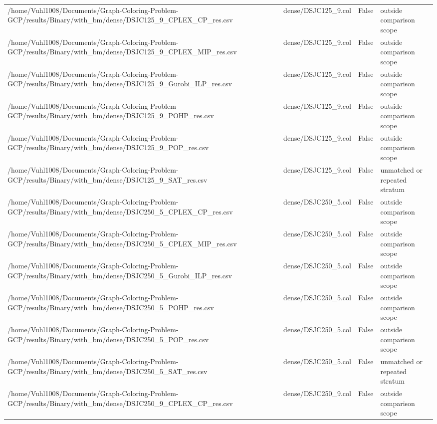 \begin{table}[htbp]
\begin{tabular}{llll}
/home/Vuhl1008/Documents/Graph-Coloring-Problem-GCP/results/Binary/with\_bm/dense/DSJC125\_9\_CPLEX\_CP\_res.csv & dense/DSJC125\_9.col & False & outside comparison scope \\
/home/Vuhl1008/Documents/Graph-Coloring-Problem-GCP/results/Binary/with\_bm/dense/DSJC125\_9\_CPLEX\_MIP\_res.csv & dense/DSJC125\_9.col & False & outside comparison scope \\
/home/Vuhl1008/Documents/Graph-Coloring-Problem-GCP/results/Binary/with\_bm/dense/DSJC125\_9\_Gurobi\_ILP\_res.csv & dense/DSJC125\_9.col & False & outside comparison scope \\
/home/Vuhl1008/Documents/Graph-Coloring-Problem-GCP/results/Binary/with\_bm/dense/DSJC125\_9\_POHP\_res.csv & dense/DSJC125\_9.col & False & outside comparison scope \\
/home/Vuhl1008/Documents/Graph-Coloring-Problem-GCP/results/Binary/with\_bm/dense/DSJC125\_9\_POP\_res.csv & dense/DSJC125\_9.col & False & outside comparison scope \\
/home/Vuhl1008/Documents/Graph-Coloring-Problem-GCP/results/Binary/with\_bm/dense/DSJC125\_9\_SAT\_res.csv & dense/DSJC125\_9.col & False & unmatched or repeated stratum \\
/home/Vuhl1008/Documents/Graph-Coloring-Problem-GCP/results/Binary/with\_bm/dense/DSJC250\_5\_CPLEX\_CP\_res.csv & dense/DSJC250\_5.col & False & outside comparison scope \\
/home/Vuhl1008/Documents/Graph-Coloring-Problem-GCP/results/Binary/with\_bm/dense/DSJC250\_5\_CPLEX\_MIP\_res.csv & dense/DSJC250\_5.col & False & outside comparison scope \\
/home/Vuhl1008/Documents/Graph-Coloring-Problem-GCP/results/Binary/with\_bm/dense/DSJC250\_5\_Gurobi\_ILP\_res.csv & dense/DSJC250\_5.col & False & outside comparison scope \\
/home/Vuhl1008/Documents/Graph-Coloring-Problem-GCP/results/Binary/with\_bm/dense/DSJC250\_5\_POHP\_res.csv & dense/DSJC250\_5.col & False & outside comparison scope \\
/home/Vuhl1008/Documents/Graph-Coloring-Problem-GCP/results/Binary/with\_bm/dense/DSJC250\_5\_POP\_res.csv & dense/DSJC250\_5.col & False & outside comparison scope \\
/home/Vuhl1008/Documents/Graph-Coloring-Problem-GCP/results/Binary/with\_bm/dense/DSJC250\_5\_SAT\_res.csv & dense/DSJC250\_5.col & False & unmatched or repeated stratum \\
/home/Vuhl1008/Documents/Graph-Coloring-Problem-GCP/results/Binary/with\_bm/dense/DSJC250\_9\_CPLEX\_CP\_res.csv & dense/DSJC250\_9.col & False & outside comparison scope \\

\end{tabular}
\end{table}

